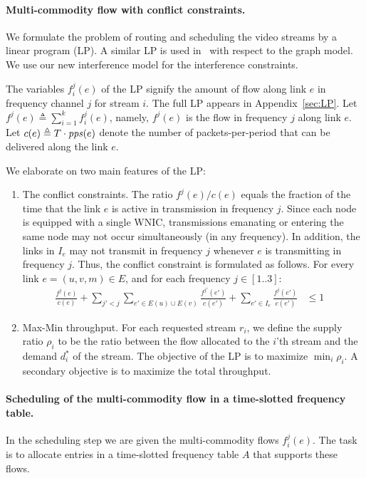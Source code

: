 \documentclass[12pt]{article}
\newenvironment{proof sketch}[1]{\noindent {\emph{Proof sketch of #1:}}}{\hfill \qed}
\newcommand{\eqdf}{\triangleq}
\newcommand{\pps}{\text{\emph{pps}}}
\begin{document}
\paragraph{Multi-commodity flow with conflict constraints.}
We formulate the problem of routing and scheduling the video streams
by a linear program (LP).  A similar LP is used
in~\cite{kumar2005algorithmic,alicherry2005joint11,buragohain2007improved} with respect to
the graph model.  We use our new interference model
for the interference constraints.

The variables $f^j_i(e)$ of the LP signify the amount of
flow along link $e$ in frequency channel $j$ for stream $i$.
The full LP  appears in Appendix~\ref{sec:LP}.
Let $f^j(e) \eqdf\sum_{i=1}^k
  f^j_i(e)$, namely, $f^j(e)$ is the flow in frequency $j$ along link
  $e$.  Let $c(e)\eqdf T \cdot \pps(e)$ denote the number
  of packets-per-period that can be delivered along the link $e$.

\medskip
\noindent
We elaborate on two main features of the LP:
\begin{enumerate}
\item The conflict constraints.  The ratio $f^j(e)/c(e)$ equals the
  fraction of the time that the link $e$ is active in transmission in
  frequency $j$. Since each node is equipped with a single WNIC,
  transmissions emanating or entering the same node may not occur
  simultaneously (in any frequency). In addition, the links in $I_e$
  may not transmit in frequency $j$ whenever $e$ is transmitting in
  frequency $j$. Thus, the conflict constraint is formulated as follows. For
  every link $e=(u,v,m)\in E$, and for each frequency $j\in[1..3]$:
  \begin{align*}
        \frac{f^j(e)}{c(e)} + \sum_{j'< j} \sum_{e'\in E(u)\cup E(v)}
    \frac{f^{j'}(e')}{c(e')} + \sum_{e' \in I_{e}}
    \frac{f^j(e')}{c(e')} & \leq 1 &
  \end{align*}
\item Max-Min throughput.
For each requested stream $r_i$, we define the supply ratio $\rho_i$
to be the ratio between the flow allocated to the $i$'th stream and
the demand $d^*_i$ of the stream.  The objective of the LP is to
maximize $\min_i \rho_i$.  A secondary objective is to maximize the
total throughput.
\end{enumerate}

\paragraph{Scheduling of the multi-commodity flow in a time-slotted
  frequency table.}
In the scheduling step we are given the multi-commodity flows
$f^j_i(e)$.  The task is to allocate entries in a
time-slotted frequency table $A$ that supports these flows.
\end{document}
